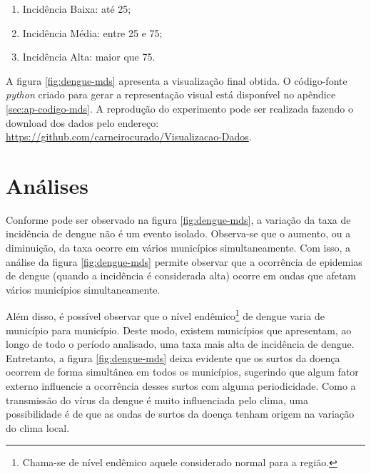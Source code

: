 \documentclass[12pt,openright,twoside,a4paper,article,brazil]{abntex2}
\begin{document}
\begin{enumerate}[noitemsep]
	\item Incidência Baixa: até 25;
	\item Incidência Média: entre 25 e 75;
	\item Incidência Alta: maior que 75.
\end{enumerate}

A figura \ref{fig:dengue-mds} apresenta a visualização final obtida. O código-fonte \emph{python} criado para gerar a representação visual está disponível no apêndice \ref{sec:ap-codigo-mds}. A reprodução do experimento pode ser realizada fazendo o download dos dados pelo endereço: \url{https://github.com/carneirocurado/Visualizacao-Dados}.


\section{Análises}
\label{sec:analises}

Conforme pode ser observado na figura \ref{fig:dengue-mds}, a variação da taxa de incidência de dengue não é um evento isolado. Observa-se que o aumento, ou a diminuição, da taxa ocorre em vários municípios simultaneamente. Com isso, a análise da figura \ref{fig:dengue-mds} permite observar que a ocorrência de epidemias de dengue (quando a incidência é considerada alta) ocorre em ondas que afetam vários municípios simultaneamente.

Além disso, é possível observar que o nível endêmico\footnote{Chama-se de nível endêmico aquele considerado normal para a região.} de dengue varia de município para município. Deste modo, existem municípios que apresentam, ao longo de todo o período analisado, uma taxa mais alta de incidência de dengue. Entretanto, a figura \ref{fig:dengue-mds} deixa evidente que os surtos da doença ocorrem de forma simultânea em todos os municípios, sugerindo que algum fator externo influencie a ocorrência desses surtos com alguma periodicidade. Como a transmissão do vírus da dengue é muito influenciada pelo clima\cite{effect-climate-dengue}, uma possibilidade é de que as ondas de surtos da doença tenham origem na variação do clima local.
\end{document}
